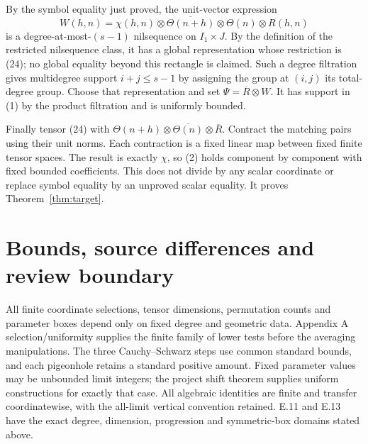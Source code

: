 \documentclass[11pt]{article}
\begin{document}
By the symbol equality just proved, the unit-vector expression
\[
 W(h,n)=\chi(h,n)\otimes\overline{\Theta(n+h)}\otimes\Theta(n)\otimes R(h,n)
                                                               \tag{24}
\]
is a degree-at-most-$(s-1)$ nilsequence on $I_1\times J$.
By the definition of the restricted nilsequence class, it has a global
representation whose restriction is (24); no global equality beyond this
rectangle is claimed. Such a degree filtration gives multidegree support
$i+j\leq s-1$ by assigning the group at $(i,j)$ its total-degree group.
Choose that representation and set $\Psi=\overline R\otimes W$.
It has support in (1) by the product filtration and is uniformly bounded.

Finally tensor (24) with
$\Theta(n+h)\otimes\overline{\Theta(n)}\otimes\overline R$.
Contract the matching pairs using their unit norms. Each contraction is
a fixed linear map between fixed finite tensor spaces. The result is exactly
$\chi$, so (2) holds component by component with fixed bounded coefficients.
This does not divide by any scalar coordinate or replace symbol equality
by an unproved scalar equality. It proves Theorem~\ref{thm:target}.

\section{Bounds, source differences and review boundary}
All finite coordinate selections, tensor dimensions, permutation counts
and parameter boxes depend only on fixed degree and geometric data.
Appendix A selection/uniformity supplies the finite family of lower tests
before the averaging manipulations. The three Cauchy--Schwarz steps use
common standard bounds, and each pigeonhole retains a standard positive
amount. Fixed parameter values may be unbounded limit integers; the project
shift theorem supplies uniform constructions for exactly that case.
All algebraic identities are finite and transfer coordinatewise, with the
all-limit vertical convention retained. E.11 and E.13 have the exact degree,
dimension, progression and symmetric-box domains stated above.
\end{document}
